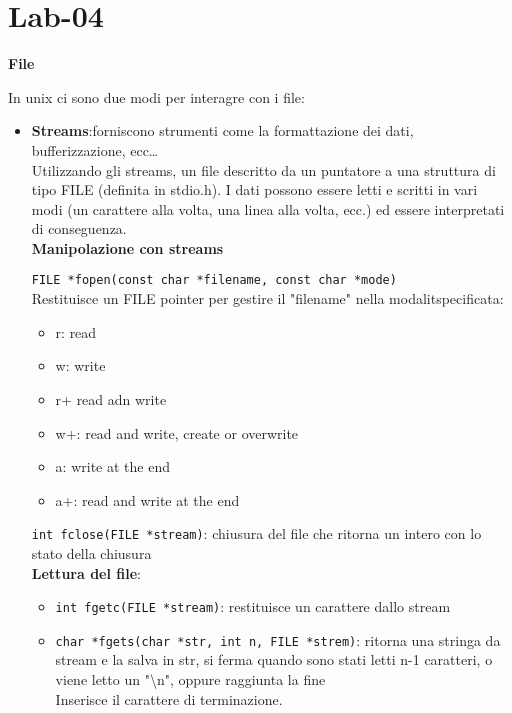 \section{Lab-04}
\begin{flushleft}
  \textbf{File}\par 
  In unix ci sono due modi per interagre con i file:
  \begin{itemize}
    \item \textbf{Streams}:forniscono strumenti come la formattazione dei dati, bufferizzazione, ecc… \\
          Utilizzando gli streams, un file \ace descritto da un puntatore a una struttura di tipo 
          FILE (definita in stdio.h). I dati possono essere letti e scritti in vari modi (un 
          carattere alla volta, una linea alla volta, ecc.) ed essere interpretati di conseguenza. \\
          \textbf{Manipolazione con streams} \par 
          \texttt{FILE *fopen(const char *filename, const char *mode)} \\
          Restituisce un FILE pointer per gestire il "filename" nella modalit\aca specificata:
          \begin{itemize}
            \item r: read
            \item w: write
            \item r+ read adn write 
            \item w+: read and write, create or overwrite
            \item a: write at the end
            \item a+: read and write at the end
          \end{itemize}
          \texttt{int fclose(FILE *stream)}: chiusura del file che ritorna un intero con lo stato della chiusura \\
          \textbf{Lettura del file}:
          \begin{itemize}
            \item \texttt{int fgetc(FILE *stream)}: restituisce un carattere dallo stream
            \item \texttt{char *fgets(char *str, int n, FILE *strem)}: ritorna una stringa da stream e la salva in 
                    str, si ferma quando sono stati letti n-1 caratteri, o viene letto un "\textbackslash n", oppure raggiunta la fine\\
                    Inserisce il carattere di terminazione. 

\end{itemize}
\end{itemize}
\end{flushleft}
